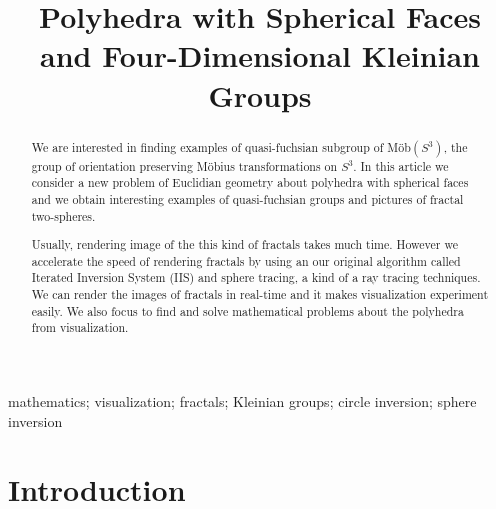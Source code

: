 \documentclass[dvipdfmx]{interact}
\theoremstyle{plain}%
\theoremstyle{definition}
\theoremstyle{remark}
\theoremstyle{problemstyle}
\begin{document}

\title{Polyhedra with Spherical Faces and Four-Dimensional Kleinian Groups}

\author{
}

\maketitle

\begin{abstract}
 We are interested in finding examples of quasi-fuchsian subgroup of
 M\"ob$(S^3)$, the group of orientation preserving M\"obius
 transformations on $S^3$. In this article we consider a new problem of
 Euclidian geometry about polyhedra with spherical faces and we obtain
 interesting examples of quasi-fuchsian groups and pictures of fractal
 two-spheres.

 Usually, rendering image of the this kind of fractals takes much time.
 However we accelerate the speed of rendering fractals by
 using an our original algorithm called Iterated Inversion System (IIS)
 and sphere tracing, a kind of a ray tracing techniques.
 We can render the images of fractals in real-time
 and it makes visualization experiment easily.
 We also focus to find and solve mathematical problems about the
 polyhedra from visualization.

\end{abstract}

\begin{keywords}
mathematics; visualization; fractals; Kleinian groups; circle inversion;
 sphere inversion
\end{keywords}

\tableofcontents

\section{Introduction}
\end{document}
